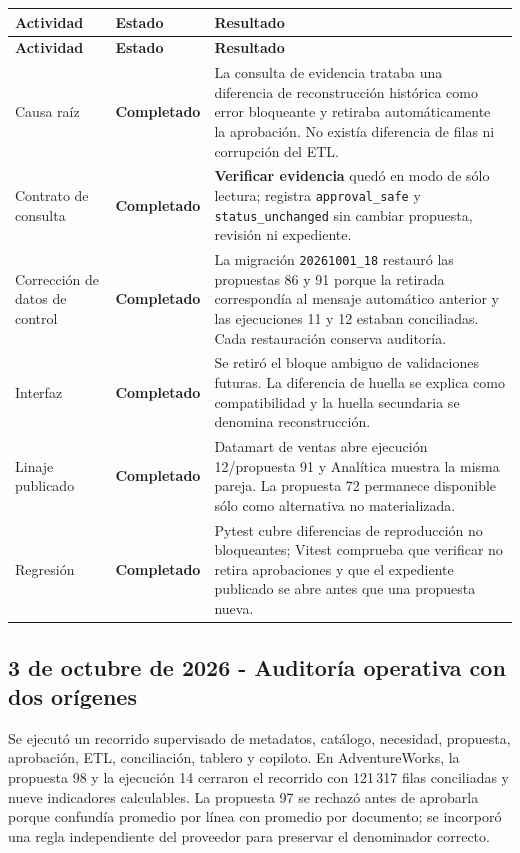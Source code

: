 \documentclass[11pt,letterpaper]{article}
\newcommand{\statusok}{\textcolor{deepgreen}{\textbf{Completado}}}
\newcommand{\file}[1]{\texttt{#1}}
\begin{document}
\begin{longtable}{@{}p{}p{}p{}@{}}
  \toprule
  \textbf{Actividad} & \textbf{Estado} & \textbf{Resultado} \\
  \midrule
  \endfirsthead
  \toprule
  \textbf{Actividad} & \textbf{Estado} & \textbf{Resultado} \\
  \midrule
  \endhead
  Causa raíz & \statusok & La consulta de evidencia trataba una diferencia de reconstrucción histórica como error bloqueante y retiraba automáticamente la aprobación. No existía diferencia de filas ni corrupción del ETL. \\
  Contrato de consulta & \statusok & \textbf{Verificar evidencia} quedó en modo de sólo lectura; registra \file{approval\_safe} y \file{status\_unchanged} sin cambiar propuesta, revisión ni expediente. \\
  Corrección de datos de control & \statusok & La migración \file{20261001\_18} restauró las propuestas 86 y 91 porque la retirada correspondía al mensaje automático anterior y las ejecuciones 11 y 12 estaban conciliadas. Cada restauración conserva auditoría. \\
  Interfaz & \statusok & Se retiró el bloque ambiguo de validaciones futuras. La diferencia de huella se explica como compatibilidad y la huella secundaria se denomina reconstrucción. \\
  Linaje publicado & \statusok & Datamart de ventas abre ejecución 12/propuesta 91 y Analítica muestra la misma pareja. La propuesta 72 permanece disponible sólo como alternativa no materializada. \\
  Regresión & \statusok & Pytest cubre diferencias de reproducción no bloqueantes; Vitest comprueba que verificar no retira aprobaciones y que el expediente publicado se abre antes que una propuesta nueva. \\
  \bottomrule
\end{longtable}

\subsection{3 de octubre de 2026 - Auditoría operativa con dos orígenes}

Se ejecutó un recorrido supervisado de metadatos, catálogo, necesidad, propuesta,
aprobación, ETL, conciliación, tablero y copiloto. En AdventureWorks, la propuesta
98 y la ejecución 14 cerraron el recorrido con 121\,317 filas conciliadas y nueve
indicadores calculables. La propuesta 97 se rechazó antes de aprobarla porque
confundía promedio por línea con promedio por documento; se incorporó una regla
independiente del proveedor para preservar el denominador correcto.
\end{document}
